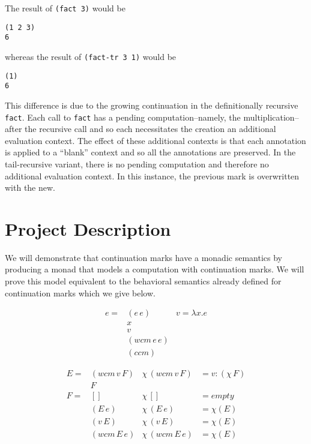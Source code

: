 \documentclass[ms]{byuprop}
\newcounter{definition}
\begin{document}
The result of \texttt{(fact 3)} would be

\begin{verbatim}
(1 2 3)
6
\end{verbatim}

whereas the result of \texttt{(fact-tr 3 1)} would be

\begin{verbatim}
(1)
6
\end{verbatim}

This difference is due to the growing continuation in the definitionally recursive
\texttt{fact}. Each call to \texttt{fact} has a pending computation--namely, the
multiplication--after the recursive call and so each necessitates the creation an
additional evaluation context. The effect of these additional contexts is that each
annotation is applied to a ``blank'' context and so all the annotations are preserved. In
the tail-recursive variant, there is no pending computation and therefore no additional
evaluation context. In this instance, the previous mark is overwritten with the new.




\section{Project Description}

We will demonstrate that continuation marks have a monadic semantics by producing a monad
that models a computation with continuation marks. We will prove  this model equivalent to
the behavioral semantics already defined for continuation marks which we give below.

\begin{align*}
e = &(e\,e) & v = \lambda x. e\\
    &x\\
    &v\\
    &(wcm\,e\,e)\\
    &(ccm)
\end{align*}

\begin{align*}
E = &(wcm\,v\,F) & \chi\,(wcm\,v\,F) &= v : (\chi\,F)\\
    &F\\
F = &[]          & \chi\,[]          &= empty\\
    &(E\,e)      & \chi\,(E\,e)      &= \chi(E)\\
    &(v\,E)      & \chi\,(v\,E)      &= \chi(E)\\
    &(wcm\,E\,e) & \chi\,(wcm\,E\,e) &= \chi(E)
\end{align*}
\end{document}
